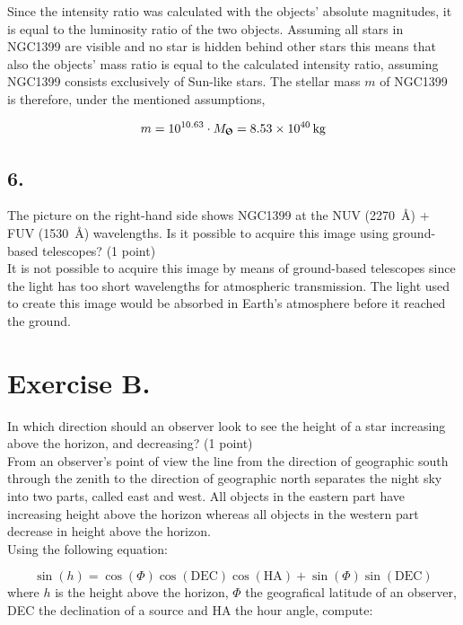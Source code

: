\documentclass[11pt,a4paper,twoside]{article}
\begin{document}
Since the intensity ratio was calculated with the objects' absolute magnitudes, it is equal to the luminosity ratio of the two objects. Assuming all stars in NGC1399 are visible and no star is hidden behind other stars this means that also the objects' mass ratio is equal to the calculated intensity ratio, assuming NGC1399 consists exclusively of Sun-like stars. The stellar mass $m$ of NGC1399 is therefore, under the mentioned assumptions, 

\begin{equation}
 m = 10^{10.63} \cdot M_{\text{\Sun}} = \SI{8.53e40}{\kg}
\end{equation}

\subsection*{6.} The picture on the right-hand side shows NGC1399 at the NUV (\SI{2270}{\angstrom}) + FUV (\SI{1530}{\angstrom}) wavelengths. Is it possible to acquire this image using ground-based telescopes? (1 point) \\

It is not possible to acquire this image by means of ground-based telescopes since the light has too short wavelengths for atmospheric transmission. The light used to create this image would be absorbed in Earth's atmosphere before it reached the ground. \\

\section*{Exercise B.}

In which direction should an observer look to see the height of a star increasing above the horizon, and decreasing? (1 point) \\

From an observer's point of view the line from the direction of geographic south through the zenith to the direction of geographic north separates the night sky into two parts, called east and west. All objects in the eastern part have increasing height above the horizon whereas all objects in the western part decrease in height above the horizon. \\

Using the following equation: 

\begin{equation}
 \sin{ \left( h \right)} = \cos{ \left( \Phi \right)} \cos{ \left( \text{DEC} \right)} \cos{ \left( \text{HA} \right)} + \sin{ \left( \Phi \right)} \sin{ \left( \text{DEC} \right)}
\end{equation}
where $h$ is the height above the horizon, $\Phi$ the geografical latitude of an observer, DEC the declination of a source and HA the hour angle, compute: 
\end{document}
